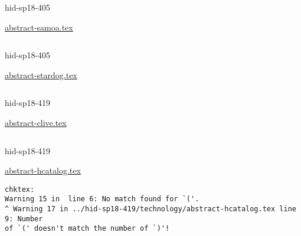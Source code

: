 \begin{IU}

hid-sp18-405

\href{https://github.com/cloudmesh-community/hid-sp18-405/blob/master//technology/abstract-samoa.tex}{abstract-samoa.tex}

\begin{tiny}
\begin{verbatim}
\end{verbatim}
\end{tiny}
\end{IU}



\begin{IU}

hid-sp18-405

\href{https://github.com/cloudmesh-community/hid-sp18-405/blob/master//technology/abstract-stardog.tex}{abstract-stardog.tex}

\begin{tiny}
\begin{verbatim}
\end{verbatim}
\end{tiny}
\end{IU}



\begin{IU}

hid-sp18-419

\href{https://github.com/cloudmesh-community/hid-sp18-419/blob/master//technology/abstract-clive.tex}{abstract-clive.tex}

\begin{tiny}
\begin{verbatim}
\end{verbatim}
\end{tiny}
\end{IU}



\begin{IU}

hid-sp18-419

\href{https://github.com/cloudmesh-community/hid-sp18-419/blob/master//technology/abstract-hcatalog.tex}{abstract-hcatalog.tex}

\begin{tiny}
\begin{verbatim}
chktex:
Warning 15 in  line 6: No match found for `('.
^ Warning 17 in ../hid-sp18-419/technology/abstract-hcatalog.tex line 9: Number
of `(' doesn't match the number of `)'!
\end{verbatim}
\end{tiny}
\end{IU}

